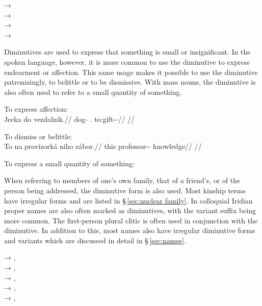 \ex
{} → \\
 →  \\
 →  \\
 →  
\xe

Diminutives are used to express that something is small or insignificant. In the
spoken language, however, it is more common to use the
diminutive to express endearment or affection. This same usage
makes it possible to use the diminutive patronizingly, to belittle or to be
dismissive. With mass nouns, the diminutive is also often used
to refer to a small quantity of something.

\pex
\a To express affection:\\
\begingl
\gla Jecka do vezdalnik.//
\glb dog-\Dim{} \First{}\Sg{}.\Acc{} to:gift-\Pv{}-\Pf{}//
\glft {}//
\endgl

\a To dismiss or belittle:\\
\begingl
\gla To na provízorká niho zábor.//
\glb this \Loc{} professor-\Dim{}-\Acc{}  knowledge//
\glft {}//
\endgl

\a To express a small quantity of something:
\xe

When referring to members of one's own family, that of a friend's, or of the person being addressed, the diminutive form is also used. Most kinship terms have irregular forms and are listed in \S\,\ref{sec:nuclear family}. In colloquial Iridian proper names are also often marked as diminutives, with the variant suffix  being more common. The first-person plural clitic  is often used in conjunction with the diminutive. In addition to this, most names also have irregular diminutive forms and variants which are discussed in detail in \S\,\ref{sec:names}.

\ex
{} → , \\
 → , \\
 → , \\
 → , \\
 → , 
\xe

